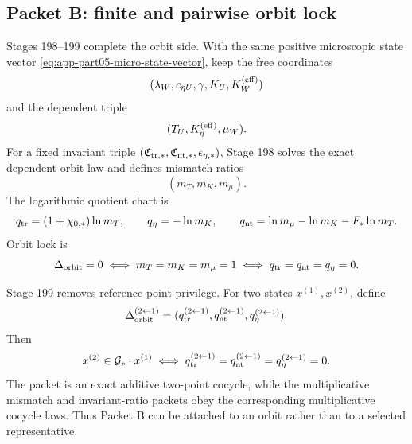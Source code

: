 \subsection{Packet B: finite and pairwise orbit lock}
Stages 198--199 complete the orbit side.  With the same positive microscopic state vector \eqref{eq:app-part05-micro-state-vector}, keep the free coordinates
\begin{equation}
\label{eq:app-part05-free-coords}
(\lambda_W,c_{\eta U},\gamma,K_U,K_W^{({\rm eff})})
\end{equation}
and the dependent triple
\begin{equation}
\label{eq:app-part05-dependent-triple}
(T_U,K_\eta^{({\rm eff})},\mu_W).
\end{equation}
For a fixed invariant triple \((\mathfrak C_{{\rm tr},*},\mathfrak C_{{\rm nt},*},\epsilon_{\eta,*})\), Stage 198 solves the exact dependent orbit law and defines mismatch ratios
\begin{equation}
\label{eq:app-part05-mismatch-triple}
(m_T,m_K,m_\mu).
\end{equation}
The logarithmic quotient chart is
\begin{equation}
\label{eq:app-part05-log-chart-mismatches}
q_{\rm tr}=(1+\chi_{0,*})\ln m_T,
\qquad
q_\eta=-\ln m_K,
\qquad
q_{\rm nt}=\ln m_\mu-\ln m_K-F_*\ln m_T.
\end{equation}
Orbit lock is
\begin{equation}
\label{eq:app-part05-single-orbit-lock}
\Delta_{\rm orbit}=0
\iff
m_T=m_K=m_\mu=1
\iff
q_{\rm tr}=q_{\rm nt}=q_\eta=0.
\end{equation}

Stage 199 removes reference-point privilege.  For two states \(x^{(1)},x^{(2)}\), define
\begin{equation}
\label{eq:app-part05-pairwise-q}
\Delta_{\rm orbit}^{(2\leftarrow1)}
=
(q_{\rm tr}^{(2\leftarrow1)},q_{\rm nt}^{(2\leftarrow1)},q_\eta^{(2\leftarrow1)}).
\end{equation}
Then
\begin{equation}
\label{eq:app-part05-two-point-orbit-lock}
x^{(2)}\in\mathcal G_*\cdot x^{(1)}
\iff
q_{\rm tr}^{(2\leftarrow1)}=q_{\rm nt}^{(2\leftarrow1)}=q_\eta^{(2\leftarrow1)}=0.
\end{equation}
The packet is an exact additive two-point cocycle, while the multiplicative mismatch and invariant-ratio packets obey the corresponding multiplicative cocycle laws.  Thus Packet B can be attached to an orbit rather than to a selected representative.

